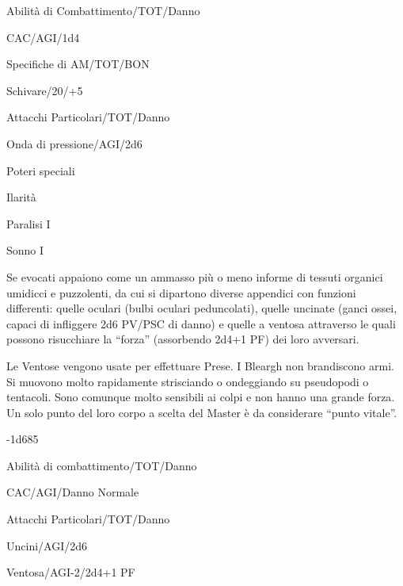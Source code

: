 \begin{parmostro}{Abilit\`a di Combattimento/TOT/Danno}
\item CAC/AGI/1d4
\end{parmostro}

\begin{parmostro}{Specifiche di AM/TOT/BON}
\item Schivare/20/+5
\end{parmostro}

\begin{parmostro}{Attacchi Particolari/TOT/Danno}
\item Onda di pressione/AGI/2d6
\end{parmostro}

\begin{parmostro}{Poteri speciali}
\item Ilarit\`a 
\item Paralisi I
\item Sonno I
\end{parmostro}




Se evocati appaiono come un ammasso pi\`u o meno informe di tessuti
organici umidicci e puzzolenti, da cui si dipartono diverse appendici
con funzioni differenti: quelle oculari (bulbi oculari peduncolati),
quelle uncinate (ganci ossei, capaci di infliggere 2d6 PV/PSC di
danno) e quelle a ventosa attraverso le quali possono risucchiare la
``forza'' (assorbendo 2d4+1 PF) dei loro avversari.

Le Ventose vengono usate per effettuare Prese. I Bleargh non brandiscono
armi. Si muovono molto rapidamente strisciando o ondeggiando su
pseudopodi o tentacoli. Sono comunque molto sensibili ai colpi e non
hanno una grande forza. Un solo punto del loro corpo a scelta del
Master \`e da considerare ``punto vitale''.

{-1d6}{85} 

\begin{parmostro}{Abilit\`a di combattimento/TOT/Danno}
\item CAC/AGI/Danno Normale
\end{parmostro}

\begin{parmostro}{Attacchi Particolari/TOT/Danno}
\item Uncini/AGI/2d6 
\item Ventosa/AGI-2/2d4+1 PF
\end{parmostro}

